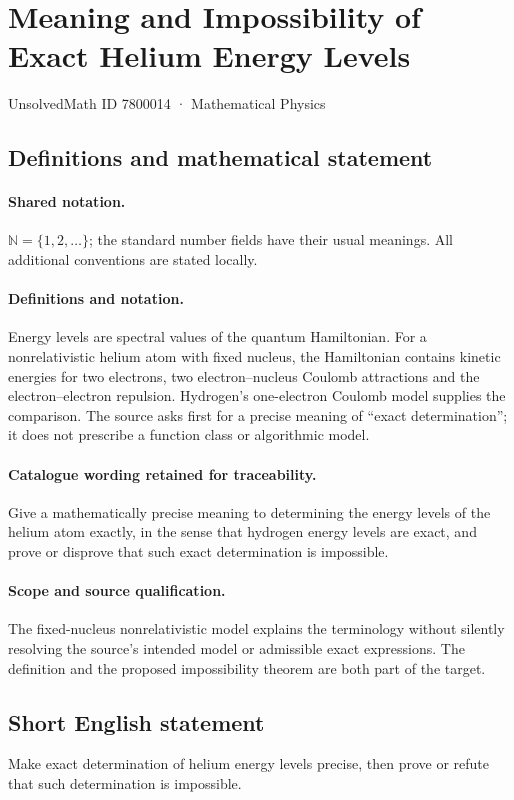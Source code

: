 \documentclass[11pt]{article}
\begin{document}
\setcounter{section}{7800013}
\section{Meaning and Impossibility of Exact Helium Energy Levels}\label{7800014}
{\small UnsolvedMath ID 7800014 · Mathematical Physics}
\subsection{Definitions and mathematical statement}

\paragraph{Shared notation.}$\mathbb N=\{1,2,\ldots\}$; the standard number fields have their usual meanings. All additional conventions are stated locally.


\paragraph{Definitions and notation.}Energy levels are spectral values of the quantum Hamiltonian. For a nonrelativistic helium atom with fixed nucleus, the Hamiltonian contains kinetic energies for two electrons, two electron--nucleus Coulomb attractions and the electron--electron repulsion. Hydrogen’s one-electron Coulomb model supplies the comparison. The source asks first for a precise meaning of ``exact determination''; it does not prescribe a function class or algorithmic model.

\paragraph{Catalogue wording retained for traceability.}
Give a mathematically precise meaning to determining the energy levels of the helium atom exactly, in the sense that hydrogen energy levels are exact, and prove or disprove that such exact determination is impossible.
\paragraph{Scope and source qualification.}The fixed-nucleus nonrelativistic model explains the terminology without silently resolving the source’s intended model or admissible exact expressions. The definition and the proposed impossibility theorem are both part of the target.
\subsection{Short English statement}
Make exact determination of helium energy levels precise, then prove or refute that such determination is impossible.
\end{document}
